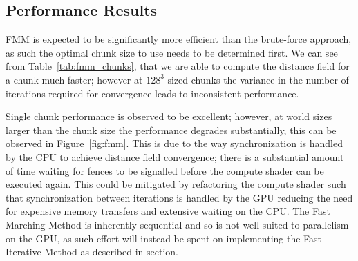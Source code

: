 \subsection{Performance Results}
FMM is expected to be significantly more efficient than the brute-force approach, as such the optimal chunk size to use
needs to be determined first. We can see from Table~\ref{tab:fmm_chunks}, that we are able to compute the distance field
for a chunk much faster; however at $128^3$ sized chunks the variance in the number of iterations required for
convergence leads to inconsistent performance.

\begin{table}[h]
    \centering
    \vspace{0.5em}
    \caption{Distance field compute shader execution time (as a total of all iterations required to achieve convergence)
        using the FMM algorithm.}
    \label{tab:fmm_chunks}
\end{table}

Single chunk performance is observed to be excellent; however, at world sizes larger than the chunk size the performance
degrades substantially, this can be observed in Figure~\ref{fig:fmm}. This is due to the way synchronization is handled
by the CPU to achieve distance field convergence; there is a substantial amount of time waiting for fences to be
signalled before the compute shader can be executed again. This could be mitigated by refactoring the compute shader
such that synchronization between iterations is handled by the GPU reducing the need for expensive memory transfers and
extensive waiting on the CPU. The Fast Marching Method is inherently sequential and so is not well suited to parallelism
on the GPU, as such effort will instead be spent on implementing the Fast Iterative Method as described in section.

